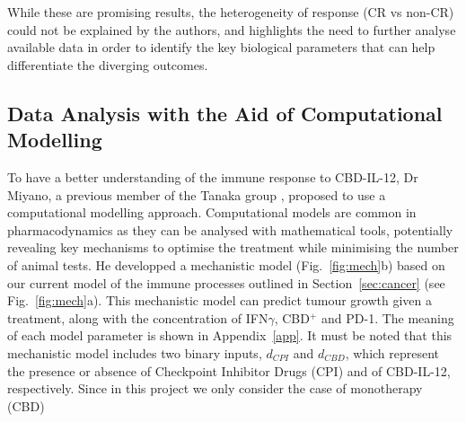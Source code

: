 \documentclass[11pt]{article}
\begin{document}
While these are promising results, the heterogeneity of response (CR vs non-CR) could not be explained by the authors, and highlights the need to further analyse available data in order to identify the key biological parameters that can help differentiate the diverging outcomes.

\subsection{Data Analysis with the Aid of Computational Modelling}\label{ssec:prevWork}

To have a better understanding of the immune response to CBD-IL-12, Dr Miyano, a previous member of the Tanaka group \cite{takuya}, proposed to use a computational modelling approach. Computational models are common in pharmacodynamics as they can be analysed with mathematical tools, potentially revealing key mechanisms to optimise the treatment while minimising the number of animal tests. He developped a mechanistic model (Fig.~\ref{fig:mech}b) based on our current model of the immune processes outlined in Section~\ref{sec:cancer} (see Fig.~\ref{fig:mech}a). This mechanistic model can predict tumour growth given a treatment, along with the concentration of IFN$\gamma$, CBD$^+$ and PD-1. The meaning of each model parameter is shown in Appendix~\ref{app}. It must be noted that this mechanistic model includes two binary inputs, $d_{CPI}$ and $d_{CBD}$, which represent the presence or absence of Checkpoint Inhibitor Drugs (CPI) and of CBD-IL-12, respectively. Since in this project we only consider the case of monotherapy (CBD)
\end{document}
